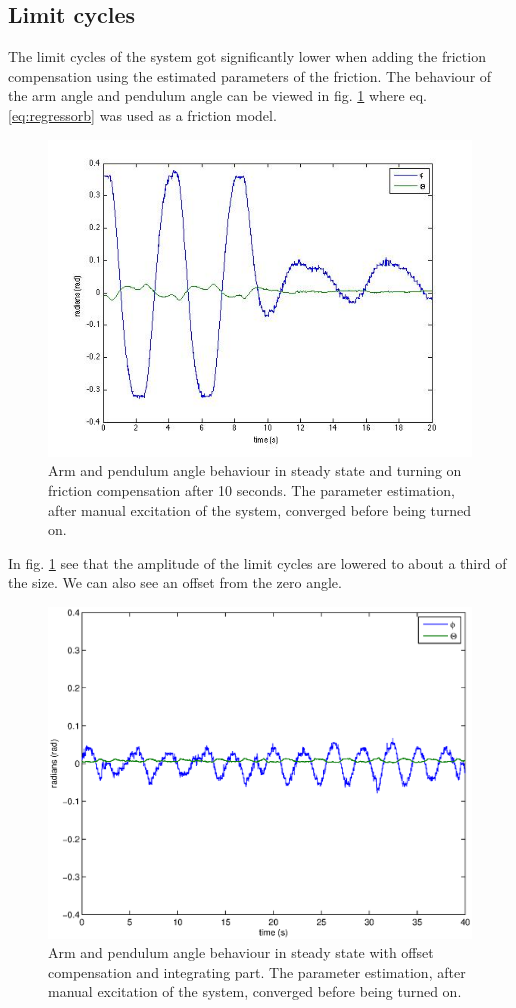 \documentclass[10pt,a4paper]{article}
\begin{document}
\subsection{Limit cycles}
The limit cycles of the system got significantly lower when adding the friction compensation using the estimated parameters of the friction. The behaviour of the arm angle and pendulum angle can be viewed in fig. \ref{fig:onoffcompensation} where eq. \ref{eq:regressorb} was used as a friction model.
\begin{figure}[H]
\centering
\includegraphics[width=1\textwidth]{plots/onoffcompensation.jpg}
\caption{Arm and pendulum angle behaviour in steady state and turning on friction compensation after 10 seconds. The parameter estimation, after manual excitation of the system, converged before being turned on.}
\label{fig:onoffcompensation}
\end{figure}
In fig. \ref{fig:onoffcompensation} see that the amplitude of the limit cycles are lowered to about a third of the size. We can also see an offset from the zero angle.
\begin{figure}[H]
\centering
\includegraphics[width=1\textwidth]{plots/thetaphilimit.eps}
\caption{Arm and pendulum angle behaviour in steady state with offset compensation and integrating part. The parameter estimation, after manual excitation of the system, converged before being turned on.}
\label{fig:compintegrate}
\end{figure}
\end{document}
